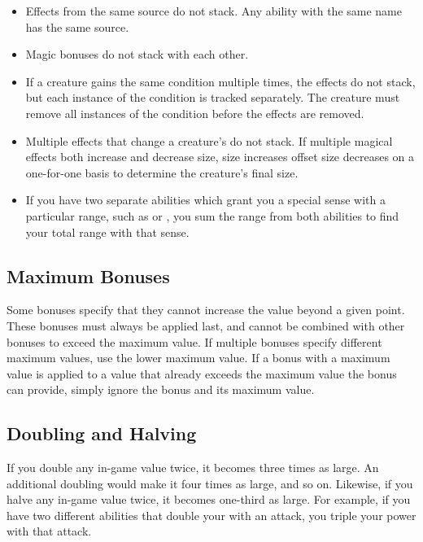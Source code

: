 
        \begin{itemize}
            \item Effects from the same source do not stack. Any ability with the same name has the same source.
            \item Magic bonuses do not stack with each other.
            \item If a creature gains the same condition multiple times, the effects do not stack, but each instance of the condition is tracked separately.
                The creature must remove all instances of the condition before the effects are removed.
            \item Multiple \magical effects that change a creature's  do not stack.
                If multiple magical effects both increase and decrease size, size increases offset size decreases on a one-for-one basis to determine the creature's final size.
            \item If you have two separate abilities which grant you a special sense with a particular range, such as  or , you sum the range from both abilities to find your total range with that sense.
        \end{itemize}

    \subsection{Maximum Bonuses}\label{Ability Limits}
        Some bonuses specify that they cannot increase the value beyond a given point.
        These bonuses must always be applied last, and cannot be combined with other bonuses to exceed the maximum value.
        If multiple bonuses specify different maximum values, use the lower maximum value.
        If a bonus with a maximum value is applied to a value that already exceeds the maximum value the bonus can provide, simply ignore the bonus and its maximum value.

    \subsection{Doubling and Halving}\label{Doubling and Halving}
        If you double any in-game value twice, it becomes three times as large.
        An additional doubling would make it four times as large, and so on.
        Likewise, if you halve any in-game value twice, it becomes one-third as large.
        For example, if you have two different abilities that double your  with an attack, you triple your power with that attack.

